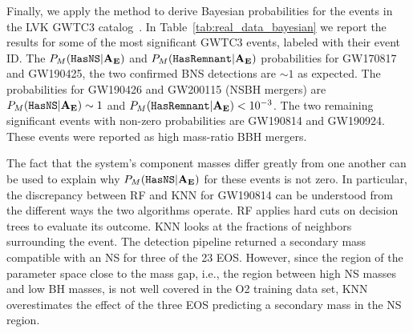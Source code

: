 Finally, we apply the method to derive Bayesian probabilities for the events in the \ac{LVK} \ac{GWTC3} catalog~\cite{LIGOScientific:2021djp}.  In Table~\ref{tab:real_data_bayesian} we
report the results for some of the most significant \ac{GWTC3} events, labeled with their event ID. The $P_M({{\tt HasNS}} |\bf{A_E})$ and $P_M({{\tt HasRemnant}} |\bf{A_E})$ probabilities for GW170817 and
GW190425, the two confirmed \ac{BNS} detections are $\sim 1$ as expected.  The probabilities for GW190426 and GW200115 (\ac{NSBH} mergers) are $P_M({{\tt HasNS}} |{\bf{A_E}}) \sim 1$ and
$P_M({{\tt HasRemnant}} |{\bf{A_E}}) < 10^{-3}$. The two remaining significant events with non-zero probabilities are GW190814 and GW190924. These events were reported as high mass-ratio BBH
mergers. 

The fact that the system's component masses differ greatly from one another can be used to explain why $P_M({{\tt HasNS}} |\bf{A_E})$ for these events is not zero. In particular, the discrepancy
between \ac{RF} and \ac{KNN} for GW190814 can be understood from the different ways the two algorithms operate. \ac{RF} applies hard cuts on decision trees to evaluate its outcome.
\ac{KNN} looks at the fractions of neighbors surrounding the event. The detection pipeline returned a secondary mass compatible with an \ac{NS} for three of the 23 \ac{EOS}. However,
since the region of the parameter space close to the mass gap, i.e., the region between high \ac{NS} masses and low \ac{BH} masses, is not well covered in the \ac{O2} training data set,
\ac{KNN} overestimates the effect of the three \ac{EOS} predicting a secondary mass in the \ac{NS} region. 

